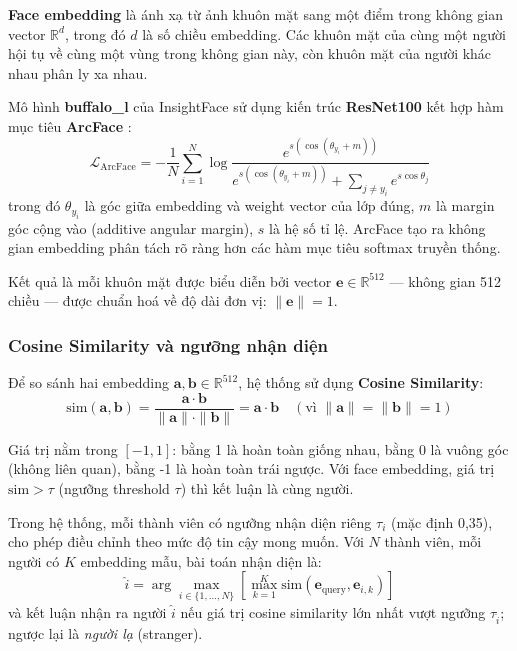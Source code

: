 \textbf{Face embedding} là ánh xạ từ ảnh khuôn mặt sang một điểm trong không gian vector $\mathbb{R}^d$, trong đó $d$ là số chiều embedding. Các khuôn mặt của cùng một người hội tụ về cùng một vùng trong không gian này, còn khuôn mặt của người khác nhau phân ly xa nhau.

\medskip
Mô hình \textbf{buffalo\_l} của InsightFace \cite{guo2021insightface} sử dụng kiến trúc \textbf{ResNet100} kết hợp hàm mục tiêu \textbf{ArcFace} \cite{deng2019arcface}:
\begin{equation}
    \mathcal{L}_{\text{ArcFace}} = -\frac{1}{N}\sum_{i=1}^{N} \log \frac{e^{s(\cos(\theta_{y_i} + m))}}{e^{s(\cos(\theta_{y_i} + m))} + \sum_{j \neq y_i} e^{s \cos\theta_j}}
\end{equation}
trong đó $\theta_{y_i}$ là góc giữa embedding và weight vector của lớp đúng, $m$ là margin góc cộng vào (additive angular margin), $s$ là hệ số tỉ lệ. ArcFace tạo ra không gian embedding phân tách rõ ràng hơn các hàm mục tiêu softmax truyền thống.

\medskip
Kết quả là mỗi khuôn mặt được biểu diễn bởi vector $\mathbf{e} \in \mathbb{R}^{512}$ --- không gian 512 chiều --- được chuẩn hoá về độ dài đơn vị: $\|\mathbf{e}\| = 1$.

\subsubsection{Cosine Similarity và ngưỡng nhận diện}
\label{subsubsec:cosine}

Để so sánh hai embedding $\mathbf{a}, \mathbf{b} \in \mathbb{R}^{512}$, hệ thống sử dụng \textbf{Cosine Similarity}:
\begin{equation}
    \text{sim}(\mathbf{a}, \mathbf{b}) = \frac{\mathbf{a} \cdot \mathbf{b}}{\|\mathbf{a}\| \cdot \|\mathbf{b}\|} = \mathbf{a} \cdot \mathbf{b} \quad (\text{vì } \|\mathbf{a}\| = \|\mathbf{b}\| = 1)
    \label{eq:cosine}
\end{equation}

Giá trị nằm trong $[-1, 1]$: bằng 1 là hoàn toàn giống nhau, bằng 0 là vuông góc (không liên quan), bằng -1 là hoàn toàn trái ngược. Với face embedding, giá trị $\text{sim} > \tau$ (ngưỡng threshold $\tau$) thì kết luận là cùng người.

\medskip
Trong hệ thống, mỗi thành viên có ngưỡng nhận diện riêng $\tau_i$ (mặc định 0{,}35), cho phép điều chỉnh theo mức độ tin cậy mong muốn. Với $N$ thành viên, mỗi người có $K$ embedding mẫu, bài toán nhận diện là:
\begin{equation}
    \hat{i} = \arg\max_{i \in \{1,\ldots,N\}} \left[\max_{k=1}^{K} \text{sim}(\mathbf{e}_{\text{query}}, \mathbf{e}_{i,k})\right]
    \label{eq:recognition}
\end{equation}
và kết luận nhận ra người $\hat{i}$ nếu giá trị cosine similarity lớn nhất vượt ngưỡng $\tau_{\hat{i}}$; ngược lại là \textit{người lạ} (stranger).

